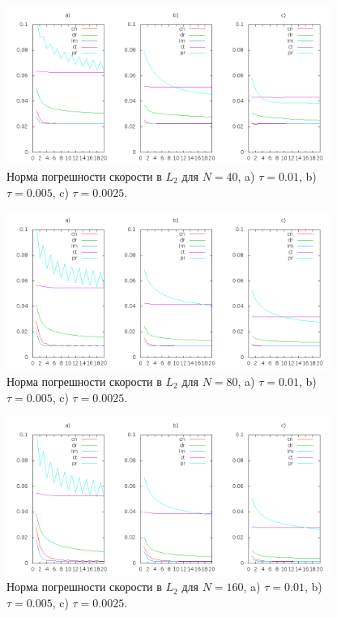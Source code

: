\documentclass[12pt]{article}
\begin{document}
\begin{figure}
	\begin{center}
		\includegraphics[width=400px]{data160/error_2}
		\caption{Норма погрешности скорости в $L_2$ для $N=40$, a) $\tau=0.01$, b) $\tau=0.005$, c) $\tau=0.0025$.}
		\label{fg:scheme-L2-2}
	\end{center}
\end{figure}

\begin{figure}
	\begin{center}
		\includegraphics[width=400px]{data160/error_3}
		\caption{Норма погрешности скорости в $L_2$ для $N=80$, a) $\tau=0.01$, b) $\tau=0.005$, c) $\tau=0.0025$.}
		\label{fg:scheme-L2-3}
	\end{center}
\end{figure}

\begin{figure}
	\begin{center}
		\includegraphics[width=400px]{data160/error_4}
		\caption{Норма погрешности скорости в $L_2$ для $N=160$, a) $\tau=0.01$, b) $\tau=0.005$, c) $\tau=0.0025$.}
		\label{fg:scheme-L2-4}
	\end{center}
\end{figure}
\end{document}
